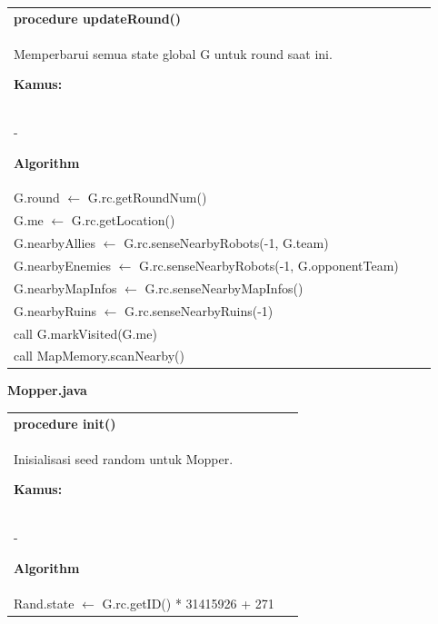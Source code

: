 \documentclass{article}
\newenvironment{pseudobox}
{
\centering
\begin{longtable}{|p{0.94\linewidth}|}
\hline
}
{
\\ \hline
\end{longtable}
\vspace{0.05cm}
}
\begin{document}
\begin{pseudobox}
\textbf{procedure updateRound()} \\
{ Memperbarui semua state global G untuk round saat ini. }

\textbf{Kamus:} \\
\hspace*{1em} -

\textbf{Algorithm} \\
\hspace*{1em} G.round $\leftarrow$ G.rc.getRoundNum() \\
\hspace*{1em} G.me $\leftarrow$ G.rc.getLocation() \\
\hspace*{1em} G.nearbyAllies $\leftarrow$ G.rc.senseNearbyRobots(-1, G.team) \\
\hspace*{1em} G.nearbyEnemies $\leftarrow$ G.rc.senseNearbyRobots(-1, G.opponentTeam) \\
\hspace*{1em} G.nearbyMapInfos $\leftarrow$ G.rc.senseNearbyMapInfos() \\
\hspace*{1em} G.nearbyRuins $\leftarrow$ G.rc.senseNearbyRuins(-1) \\

\hspace*{1em} call G.markVisited(G.me) \\
\hspace*{1em} call MapMemory.scanNearby()
\end{pseudobox}



\item \textbf{Mopper.java}

\begin{pseudobox}
\textbf{procedure init()} \\
{ Inisialisasi seed random untuk Mopper. }

\textbf{Kamus:} \\
\hspace*{1em} -

\textbf{Algorithm} \\
\hspace*{1em} Rand.state $\leftarrow$ G.rc.getID() * 31415926 + 271
\end{pseudobox}
\end{document}
